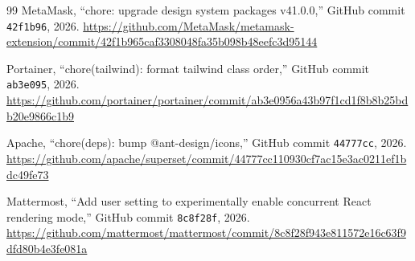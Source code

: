 \documentclass{article}
\begin{document}
\begin{thebibliography}{99}
{MetaMask},
``chore: upgrade design system packages v41.0.0,''
GitHub commit \texttt{42f1b96}, 2026.
\url{https://github.com/MetaMask/metamask-extension/commit/42f1b965caf3308048fa35b098b48eefc3d95144}

{Portainer},
``chore(tailwind): format tailwind class order,''
GitHub commit \texttt{ab3e095}, 2026.
\url{https://github.com/portainer/portainer/commit/ab3e0956a43b97f1cd1f8b8b25bdb20e9866c1b9}

{Apache},
``chore(deps): bump @ant-design/icons,''
GitHub commit \texttt{44777cc}, 2026.
\url{https://github.com/apache/superset/commit/44777cc110930cf7ac15e3ac0211ef1bdc49fe73}

{Mattermost},
``Add user setting to experimentally enable concurrent React rendering mode,''
GitHub commit \texttt{8c8f28f}, 2026.
\url{https://github.com/mattermost/mattermost/commit/8c8f28f943e811572e16c63f9dfd80b4e3fe081a}

\end{thebibliography}
\end{document}
